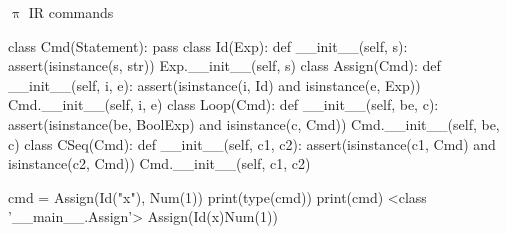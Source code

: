 \documentclass{beamer}
\begin{document}

\begin{frame}{{\color{red}$\uppi$ IR} commands}

\begin{adjustbox}{width=0.8\textwidth}
\begin{python}
class Cmd(Statement): pass
class Id(Exp):
    def __init__(self, s):
        assert(isinstance(s, str))
        Exp.__init__(self, s)
class Assign(Cmd):
    def __init__(self, i, e): 
        assert(isinstance(i, Id) and isinstance(e, Exp))
        Cmd.__init__(self, i, e)
class Loop(Cmd):
    def __init__(self, be, c):
        assert(isinstance(be, BoolExp) and isinstance(c, Cmd))
        Cmd.__init__(self, be, c)
class CSeq(Cmd):
    def __init__(self, c1, c2):
        assert(isinstance(c1, Cmd) and isinstance(c2, Cmd))
        Cmd.__init__(self, c1, c2)
\end{python}
\end{adjustbox}

\framebreak
        
\begin{python}
cmd = Assign(Id("x"), Num(1))
print(type(cmd))
print(cmd)
<class '__main__.Assign'>
Assign(Id(x)Num(1))
\end{python}
\end{frame}

\end{document}
